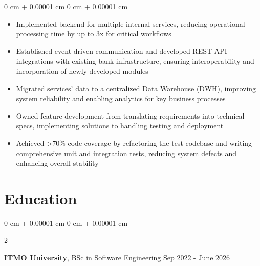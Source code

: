 \documentclass[10pt, letterpaper]{article}
\newenvironment{highlights}{
    \begin{itemize}[
        topsep=0.10 cm,
        parsep=0.10 cm,
        partopsep=0pt,
        itemsep=0pt,
        leftmargin=0 cm + 10pt
    ]
}{
    \end{itemize}
} %
\newenvironment{onecolentry}{
    \begin{adjustwidth}{
        0 cm + 0.00001 cm
    }{
        0 cm + 0.00001 cm
    }
}{
    \end{adjustwidth}
} %
\newenvironment{twocolentry}[2][]{
    \onecolentry
    \def\secondColumn{#2}
    \setcolumnwidth{\fill, 4.5 cm}
    \begin{paracol}{2}
}{
    \switchcolumn \raggedleft \secondColumn
    \end{paracol}
    \endonecolentry
} %
\begin{document}
        \vspace{0.20 cm}
        \begin{onecolentry}
            \begin{highlights}
                \item Implemented backend for multiple internal services, reducing operational processing time by up to 3x for critical workflows
                \item Established event-driven communication and developed REST API integrations with existing bank infrastructure, ensuring interoperability and incorporation of newly developed modules
                \item Migrated services' data to a centralized Data Warehouse (DWH), improving system reliability and enabling analytics for key business processes
                \item Owned feature development from translating requirements into technical specs, implementing solutions to handling testing and deployment 
                \item Achieved >70\% code coverage by refactoring the test codebase and writing comprehensive unit and integration tests, reducing system defects and enhancing overall stability
            \end{highlights}
        \end{onecolentry}

\section{Education}
        \begin{twocolentry} {Sep 2022 - June 2026}
            \textbf{ITMO University}, BSc in Software Engineering\end{twocolentry}
\end{document}
